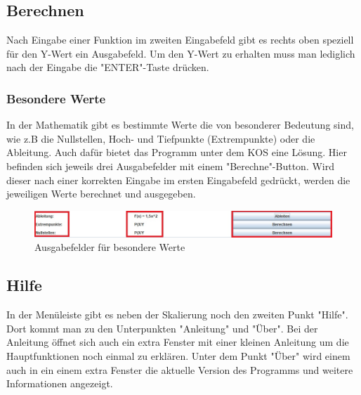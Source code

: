 
\subsection{Berechnen}
Nach Eingabe einer Funktion im zweiten Eingabefeld gibt es rechts oben speziell für den Y-Wert ein Ausgabefeld. Um den Y-Wert zu erhalten muss man lediglich nach der Eingabe die "ENTER"-Taste drücken.

\subsubsection{Besondere Werte} 
In der Mathematik gibt es bestimmte Werte die von besonderer Bedeutung sind, wie z.B die Nullstellen, Hoch- und Tiefpunkte (Extrempunkte) oder die Ableitung. Auch dafür bietet das Programm unter dem KOS eine Lösung. Hier befinden sich jeweils drei Ausgabefelder mit einem "Berechne"-Button. Wird dieser nach einer korrekten Eingabe im ersten Eingabefeld gedrückt, werden die jeweiligen Werte berechnet und ausgegeben.

\begin{figure}[ht]
	\centering
	\includegraphics[width=1.0\textwidth]{Bilder/GR_6.jpg}
	\caption{Ausgabefelder für besondere Werte}
\end{figure}

\newpage


\subsection{Hilfe}
In der Menüleiste gibt es neben der Skalierung noch den zweiten Punkt "Hilfe". Dort kommt man zu den Unterpunkten "Anleitung" und "Über". 
\newline
Bei der Anleitung öffnet sich auch ein extra Fenster mit einer kleinen Anleitung um die Hauptfunktionen noch einmal zu erklären. 
\newline
Unter dem Punkt "Über" wird einem auch in ein einem extra Fenster die aktuelle Version des Programms und weitere Informationen angezeigt.

